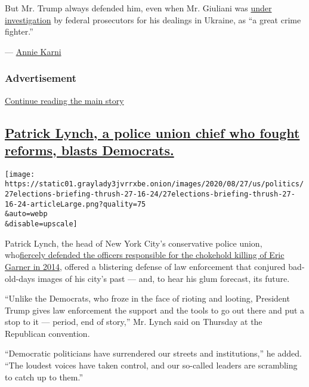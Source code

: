 But Mr. Trump always defended him, even when Mr. Giuliani was
\href{https://www.nytimes3xbfgragh.onion/2019/10/11/us/politics/rudy-giuliani-investigation.html}{under
investigation} by federal prosecutors for his dealings in Ukraine, as
``a great crime fighter.''

--- \href{https://www.nytimes3xbfgragh.onion/by/annie-karni}{Annie
Karni}

\hypertarget{advertisement-4}{%
\subsubsection{Advertisement}\label{advertisement-4}}

\protect\hyperlink{after-dfp-ad-mid5}{Continue reading the main story}

\hypertarget{patrick-lynch-a-police-union-chief-who-fought-reforms-blasts-democrats}{%
\subsection{\texorpdfstring{\protect\hyperlink{patrick-lynch-a-police-union-chief-who-fought-reforms-blasts-democrats}{Patrick
Lynch, a police union chief who fought reforms, blasts
Democrats.}}{Patrick Lynch, a police union chief who fought reforms, blasts Democrats.}}\label{patrick-lynch-a-police-union-chief-who-fought-reforms-blasts-democrats}}

\texttt{[image: https://static01.graylady3jvrrxbe.onion/images/2020/08/27/us/politics/27elections-briefing-thrush-27-16-24/27elections-briefing-thrush-27-16-24-articleLarge.png?quality=75\\\&auto=webp\\\&disable=upscale]}

Patrick Lynch, the head of New York City's conservative police union,
who\href{https://www.nbcnews.com/news/us-news/police-union-suggests-work-slowdown-after-nypd-officer-fired-eric-n1044486}{fiercely
defended the officers responsible for the chokehold killing of Eric
Garner in 2014}, offered a blistering defense of law enforcement that
conjured bad-old-days images of his city's past --- and, to hear his
glum forecast, its future.

``Unlike the Democrats, who froze in the face of rioting and looting,
President Trump gives law enforcement the support and the tools to go
out there and put a stop to it --- period, end of story,'' Mr. Lynch
said on Thursday at the Republican convention.

``Democratic politicians have surrendered our streets and
institutions,'' he added. ``The loudest voices have taken control, and
our so-called leaders are scrambling to catch up to them.''

